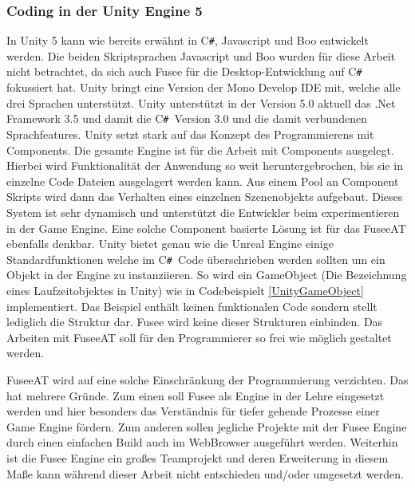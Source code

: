 \documentclass[pagesize, paper=a4, fontsize=12pt, titlepage=true, headings=small, headnosepline, abstractoff, liststotoc, nochapterprefix, plainheadsepline, twoside]{scrreprt}
\newcommand{\CS}{C\texttt{\#}}
\newcommand{\CSS}{C\texttt{\# }}
\begin{document}
\subsubsection{Coding in der Unity Engine 5}
In Unity 5 kann wie bereits erwähnt in \CS, Javascript und Boo entwickelt werden. Die beiden Skriptsprachen Javascript und Boo wurden für diese Arbeit nicht betrachtet, da sich auch Fusee für die Desktop-Entwicklung auf \CSS fokussiert hat. Unity bringt eine Version der Mono Develop IDE mit, welche alle drei Sprachen unterstützt. Unity unterstützt in der Version 5.0 aktuell das .Net Framework 3.5 und damit die \CSS Version 3.0 und die damit verbundenen Sprachfeatures. Unity setzt stark auf das Konzept des Programmierens mit Components. Die gesamte Engine ist für die Arbeit mit Components ausgelegt. Hierbei wird Funktionalität der Anwendung so weit heruntergebrochen, bis sie in einzelne Code Dateien ausgelagert werden kann. Aus einem Pool an Component Skripts wird dann das Verhalten eines einzelnen Szenenobjekts aufgebaut. Dieses System ist sehr dynamisch und unterstützt die Entwickler beim experimentieren in der Game Engine. Eine solche Component basierte Lösung ist für das FuseeAT ebenfalls denkbar. Unity bietet genau wie die Unreal Engine einige Standardfunktionen welche im \CSS Code überschrieben werden sollten um ein Objekt in der Engine zu instanziieren. So wird ein GameObject (Die Bezeichnung eines Laufzeitobjektes in Unity) wie in Codebeispielt \ref{UnityGameObject} implementiert. Das Beispiel enthält keinen funktionalen Code sondern stellt lediglich die Struktur dar. Fusee wird keine dieser Strukturen einbinden. Das Arbeiten mit FuseeAT soll für den Programmierer so frei wie möglich gestaltet werden.



FuseeAT wird auf eine solche Einschränkung der Programmierung verzichten. Das hat mehrere Gründe. Zum einen soll Fusee als Engine in der Lehre eingesetzt werden und hier besonders das Verständnis für tiefer gehende Prozesse einer Game Engine fördern. Zum anderen sollen jegliche Projekte mit der Fusee Engine durch einen einfachen Build auch im WebBrowser ausgeführt werden. Weiterhin ist die Fusee Engine ein großes Teamprojekt und deren Erweiterung in diesem Maße kann während dieser Arbeit nicht entschieden und/oder umgesetzt werden.
\end{document}
